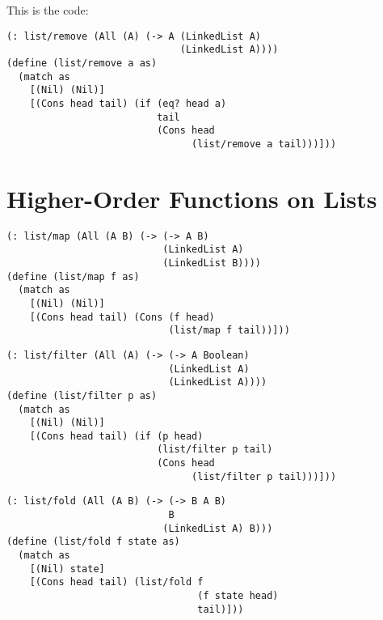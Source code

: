 \documentclass{article}
\begin{document}
\vspace{1cm}

This is the code:

\begin{lstlisting}
(: list/remove (All (A) (-> A (LinkedList A)
                              (LinkedList A))))
(define (list/remove a as)
  (match as
    [(Nil) (Nil)]
    [(Cons head tail) (if (eq? head a)
                          tail
                          (Cons head
                                (list/remove a tail)))]))
\end{lstlisting}

\section{Higher-Order Functions on Lists}

\begin{lstlisting}
(: list/map (All (A B) (-> (-> A B)
                           (LinkedList A)
                           (LinkedList B))))
(define (list/map f as)
  (match as
    [(Nil) (Nil)]
    [(Cons head tail) (Cons (f head)
                            (list/map f tail))]))
\end{lstlisting}

\begin{lstlisting}
(: list/filter (All (A) (-> (-> A Boolean)
                            (LinkedList A)
                            (LinkedList A))))
(define (list/filter p as)
  (match as
    [(Nil) (Nil)]
    [(Cons head tail) (if (p head)
                          (list/filter p tail)
                          (Cons head
                                (list/filter p tail)))]))
\end{lstlisting}

\begin{lstlisting}
(: list/fold (All (A B) (-> (-> B A B)
                            B
                           (LinkedList A) B)))
(define (list/fold f state as)
  (match as
    [(Nil) state]
    [(Cons head tail) (list/fold f
                                 (f state head)
                                 tail)]))
\end{lstlisting}
\end{document}

